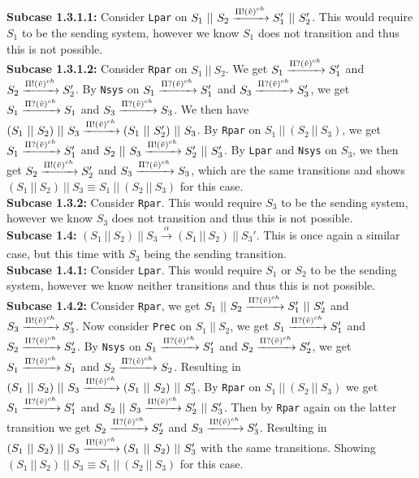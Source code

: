 \indent \indent \indent \textbf{Subcase 1.3.1.1: } Consider \texttt{Lpar} on $S_1 \ || \ S_2 \xrightarrow[]{\Pi ! (\Tilde{v})^{ch}} S_1' \ || \ S_2'$. This would require $S_1$ to be the sending system, however we know $S_1$ does not transition and thus this is not possible.\\
\indent \indent \indent \textbf{Subcase 1.3.1.2: } Consider \texttt{Rpar} on $S_1\ ||\ S_2$. We get $S_1 \xrightarrow[]{\Pi ? (\Tilde{v})^{ch}} S_1'$ and $S_2 \xrightarrow[]{\Pi ! (\Tilde{v})^{ch}} S_2'$. By \texttt{Nsys} on $S_1 \xrightarrow[]{\Pi ? (\Tilde{v})^{ch}} S_1'$ and $S_3 \xrightarrow[]{\Pi ? (\Tilde{v})^{ch}} S_3'$, we get $S_1 \xrightarrow[]{\Pi ? (\Tilde{v})^{ch}} S_1$ and $S_3 \xrightarrow[]{\Pi ? (\Tilde{v})^{ch}} S_3$. We then have $(S_1 \ || \ S_2)\ ||\ S_3 \xrightarrow[]{\Pi ! (\Tilde{v})^{ch}} (S_1 \ || \ S_2')\ ||\ S_3$. By \texttt{Rpar} on $S_1 \ ||\ (S_2 \ || \ S_3)$, we get $S_1 \xrightarrow[]{\Pi ? (\Tilde{v})^{ch}} S_1'$ and $S_2 \ || \ S_3 \xrightarrow[]{\Pi ! (\Tilde{v})^{ch}} S_2' \ || \ S_3'$. By \texttt{Lpar} and \texttt{Nsys} on $S_3$, we then get $S_2 \xrightarrow[]{\Pi ! (\Tilde{v})^{ch}} S_2'$ and $S_3 \xrightarrow[]{\Pi ? (\Tilde{v})^{ch}} S_3$, which are the same transitions and shows $(S_1 \ ||\ S_2 )\ || \ S_3 \equiv S_1 \ ||\ (S_2 \ || \ S_3)$ for this case.\\
\indent \indent \textbf{Subcase 1.3.2: } Consider \texttt{Rpar}. This would require $S_3$ to be the sending system, however we know $S_3$ does not transition and thus this is not possible.\\
\indent \textbf{Subcase 1.4: }$(S_1 \ || \ S_2)\ ||\ S_3 \xrightarrow[]{\alpha} (S_1 \ || \ S_2)\ ||\ S_3'$. This is once again a similar case, but this time with $S_3$ being the sending transition.\\
\indent \indent \textbf{Subcase 1.4.1: } Consider \texttt{Lpar}. This would require $S_1$ or $S_2$ to be the sending system, however we know neither transitions and thus this is not possible.\\
\indent \indent \textbf{Subcase 1.4.2: } Consider \texttt{Rpar}, we get $S_1 \ || \ S_2 \xrightarrow[]{\Pi ? (\Tilde{v})^{ch}} S_1' \ || \ S_2'$ and $S_3 \xrightarrow[]{\Pi ! (\Tilde{v})^{ch}} S_3'$. Now consider \texttt{Prec} on $S_1\ ||\ S_2$, we get $S_1 \xrightarrow[]{\Pi ? (\Tilde{v})^{ch}} S_1'$ and $S_2 \xrightarrow[]{\Pi ? (\Tilde{v})^{ch}} S_2'$. By \texttt{Nsys} on $S_1 \xrightarrow[]{\Pi ? (\Tilde{v})^{ch}} S_1'$ and $S_2 \xrightarrow[]{\Pi ? (\Tilde{v})^{ch}} S_2'$, we get $S_1 \xrightarrow[]{\Pi ? (\Tilde{v})^{ch}} S_1$ and $S_2 \xrightarrow[]{\Pi ? (\Tilde{v})^{ch}} S_2$. Resulting in $(S_1 \ || \ S_2)\ ||\ S_3 \xrightarrow[]{\Pi ! (\Tilde{v})^{ch}} (S_1 \ || \ S_2)\ ||\ S_3' $. By \texttt{Rpar} on $S_1 \ ||\ (S_2 \ || \ S_3)$ we get $S_1 \xrightarrow[]{\Pi ? (\Tilde{v})^{ch}} S_1'$ and $S_2 \ || \ S_3 \xrightarrow[]{\Pi ! (\Tilde{v})^{ch}} S_2' \ || \ S_3'$. Then by \texttt{Rpar} again on the latter transition we get $S_2 \xrightarrow[]{\Pi ? (\Tilde{v})^{ch}} S_2'$ and $S_3 \xrightarrow[]{\Pi ! (\Tilde{v})^{ch}} S_3'$. Resulting in $(S_1 \ || \ S_2)\ ||\ S_3 \xrightarrow[]{\Pi ! (\Tilde{v})^{ch}} (S_1 \ || \ S_2)\ ||\ S_3' $ with the same transitions. Showing $(S_1 \ ||\ S_2 )\ || \ S_3 \equiv S_1 \ ||\ (S_2 \ || \ S_3)$ for this case.\\
